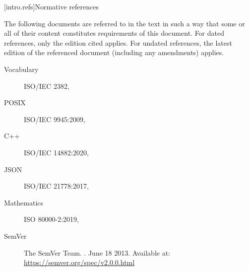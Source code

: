 
[intro.refs]{Normative references}%
%

\pnum
{}%
The following documents are referred to in the text in such a way that some or
all of their content constitutes requirements of this document. For dated
references, only the edition cited applies. For undated references, the latest
edition of the referenced document (including any amendments) applies.

\begin{description}


\item[Vocabulary] ISO/IEC 2382, 
\item[POSIX] ISO/IEC 9945:2009, 
\item[C++] ISO/IEC 14882:2020, 
\item[JSON] ISO/IEC 21778:2017, 
\item[Mathematics] ISO 80000-2:2019, 
\item[SemVer] The SemVer Team. . June 18 2013. Available at: \url{https://semver.org/spec/v2.0.0.html}


\end{description}
